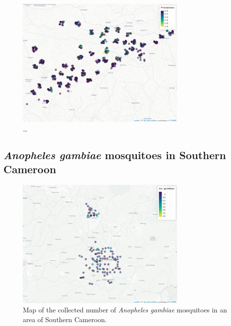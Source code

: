 \documentclass[
  letterpaper,
]{krantz}
\begin{document}
\begin{figure}

{\centering \includegraphics[width=3.31in,height=\textheight]{./figures/malkenya_ch1.png}

}

\caption{\label{fig-malkenya-ch1}\ldots{}}

\end{figure}

\hypertarget{anopheles-gambiae-mosquitoes-in-southern-cameroon}{%
\subsection{\texorpdfstring{\emph{Anopheles gambiae} mosquitoes in
Southern
Cameroon}{Anopheles gambiae mosquitoes in Southern Cameroon}}\label{anopheles-gambiae-mosquitoes-in-southern-cameroon}}

\begin{figure}

{\centering \includegraphics[width=3.31in,height=\textheight]{./figures/anopheles_ch1.png}

}

\caption{\label{fig-anopheles-ch1}Map of the collected number of
\emph{Anopheles gambiae} mosquitoes in an area of Southern Cameroon.}

\end{figure}
\end{document}
